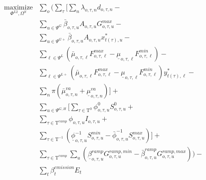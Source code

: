 \documentclass[final]{IEEEtran}
\newcommand{\Tau}{\mathrm{T}}
\begin{document}
\begin{align}
\label{sub_obj} \underset{\Phi^{L2}, \Omega^{S}}{\text{maximize}} &\sum\limits_o \Bigg( \sum\limits_{\tau} \Big[ \sum\limits_n \lambda_{o, \tau, n} d_{o, \tau, n} - \nonumber \\
&\sum\limits_{u \in \Psi^G} \bar{\beta}_{o, \tau, u} A_{o, \tau, u} G_{o, \tau, u}^{max} - \nonumber \\
&\sum\limits_{u \in \Psi^{G+}} \bar{\beta}_{o, \tau, u} A_{o, \tau, u} x_{t(\tau), u}^* - \nonumber \\
&\sum\limits_{\ell \in \Psi^L} \left( \bar{\mu}_{o, \tau, \ell} F_{o, \tau, \ell}^{max} - \underline{\mu}_{o, \tau, \ell} F_{o, \tau, \ell}^{min} \right) - \nonumber \\
&\sum\limits_{\ell \in \Psi^{L+}} \left( \bar{\mu}_{o, \tau, \ell} F_{o, \tau, \ell}^{max} - \underline{\mu}_{o, \tau, \ell} F_{o, \tau, \ell}^{min} \right) y_{t(\tau), \ell}^* - \nonumber \\
&\sum\limits_{n} \pi ( \bar{\mu}^{va}_{o, \tau, n} + \underline{\mu}^{va}_{o, \tau, n} ) \Big] + \nonumber \\
&\sum\limits_{u \in \Psi^{G, H}} \Big[ \sum\limits_{\tau \in \Tau^{0}}  \phi_{o, \tau, u}^{0} S^{0}_{o, \tau, u} + \nonumber \\
&\sum\limits_{\tau \in \Tau^{ramp}} \phi_{o, \tau, u} I_{o, \tau, u} + \nonumber \\
&\sum\limits_{\tau \in \Tau^{-1}} \left( \underline{\phi}^{-1}_{o, \tau, u} S^{min}_{o, \tau, u} - \bar{\phi}^{-1}_{o, \tau, u} S^{max}_{o, \tau, u} \right) \Big] + \nonumber \\
&\sum\limits_{\tau \in \Tau^{ramp}} \sum\limits_{u} \left( \underline{\beta}_{o, \tau, u}^{ramp} G^{ramp,min}_{o, \tau, u} - \bar{\beta}_{o, \tau, u}^{ramp} G^{ramp,max}_{o, \tau, u} \right) \Bigg) - \nonumber \\
&\sum\limits_{t} \beta_{t}^{emission} E_{t}
\end{align}
\end{document}
